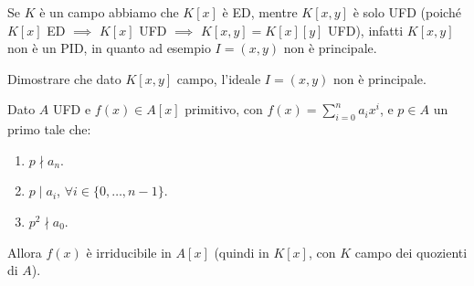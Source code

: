 \documentclass[11pt]{scrartcl}
\begin{document}
\begin{remark}
    Se $K$ è un campo abbiamo che $K[x]$ è ED, mentre $K[x,y]$ è solo UFD (poiché $K[x]$ ED $\implies$ $K[x]$ UFD $\implies$ $K[x,y] = K[x][y]$ UFD), 
    infatti $K[x,y]$ non è un PID, in quanto ad esempio $I = (x,y)$ non è principale.
\end{remark}

\begin{exercise}
    Dimostrare che dato $K[x,y]$ campo, l'ideale $I = (x,y)$ non è principale.
\end{exercise}

\begin{soln}
    
\end{soln}

\begin{proposition}
\label{eisenstein}
Dato $A$ UFD e $f(x) \in A[x]$ primitivo, con $f(x) = \sum_{i=0}^n a_ix^i$, e $p \in A$ un primo tale che:
\begin{enumerate}[(1)]
    \item $p \nmid a_n$.
    \item $p \mid a_i$, $\forall i \in \{0,\ldots,n-1\}$.
    \item $p^2 \nmid a_0$.
\end{enumerate}
Allora $f(x)$ è irriducibile in $A[x]$ (quindi in $K[x]$, con $K$ campo dei quozienti di $A$).
\end{proposition}
\end{document}
